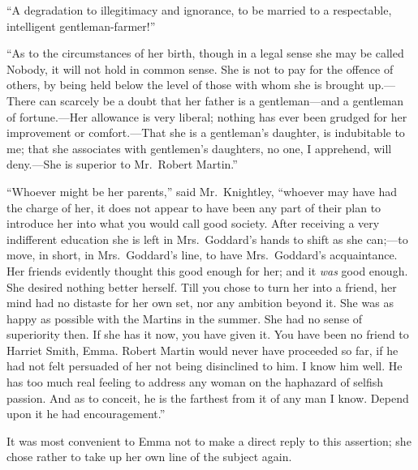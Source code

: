 ``A degradation to illegitimacy and ignorance, to be married
to a respectable, intelligent gentleman-farmer!''

``As to the circumstances of her birth, though in a legal sense
she may be called Nobody, it will not hold in common sense.
She is not to pay for the offence of others, by being held below
the level of those with whom she is brought up.---There can scarcely
be a doubt that her father is a gentleman---and a gentleman of
fortune.---Her allowance is very liberal; nothing has ever been grudged
for her improvement or comfort.---That she is a gentleman's daughter,
is indubitable to me; that she associates with gentlemen's daughters,
no one, I apprehend, will deny.---She is superior to Mr.\ Robert Martin.''

``Whoever might be her parents,'' said Mr.\ Knightley, ``whoever may
have had the charge of her, it does not appear to have been any part
of their plan to introduce her into what you would call good society.
After receiving a very indifferent education she is left in
Mrs.\ Goddard's hands to shift as she can;---to move, in short,
in Mrs.\ Goddard's line, to have Mrs.\ Goddard's acquaintance.
Her friends evidently thought this good enough for her; and it \emph{was}
good enough.  She desired nothing better herself.  Till you chose
to turn her into a friend, her mind had no distaste for her own set,
nor any ambition beyond it.  She was as happy as possible with the
Martins in the summer.  She had no sense of superiority then.
If she has it now, you have given it.  You have been no friend to
Harriet Smith, Emma.  Robert Martin would never have proceeded so far,
if he had not felt persuaded of her not being disinclined to him.
I know him well.  He has too much real feeling to address any
woman on the haphazard of selfish passion.  And as to conceit,
he is the farthest from it of any man I know.  Depend upon it he
had encouragement.''

It was most convenient to Emma not to make a direct reply to this
assertion; she chose rather to take up her own line of the subject again.

